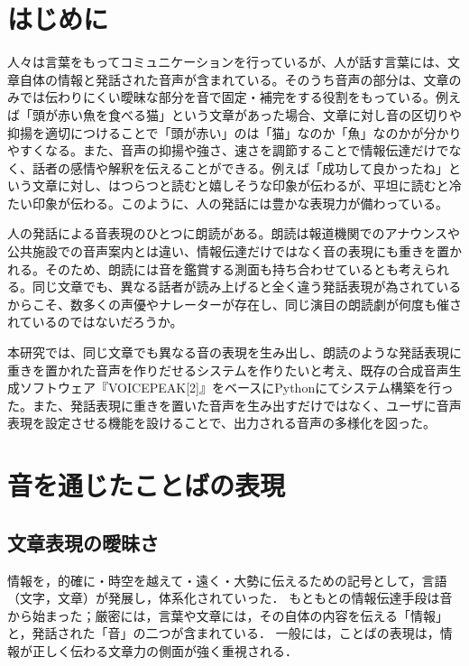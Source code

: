 



\section{はじめに}

人々は言葉をもってコミュニケーションを行っているが、人が話す言葉には、文章自体の情報と発話された音声が含まれている。そのうち音声の部分は、文章のみでは伝わりにくい曖昧な部分を音で固定・補完をする役割をもっている。例えば「頭が赤い魚を食べる猫」\cite{twitter}という文章があった場合、文章に対し音の区切りや抑揚を適切につけることで「頭が赤い」のは「猫」なのか「魚」なのかが分かりやすくなる。また、音声の抑揚や強さ、速さを調節することで情報伝達だけでなく、話者の感情や解釈を伝えることができる。例えば「成功して良かったね」という文章に対し、はつらつと読むと嬉しそうな印象が伝わるが、平坦に読むと冷たい印象が伝わる。このように、人の発話には豊かな表現力が備わっている。

人の発話による音表現のひとつに朗読がある。朗読は報道機関でのアナウンスや公共施設での音声案内とは違い、情報伝達だけではなく音の表現にも重きを置かれる。そのため、朗読には音を鑑賞する測面も持ち合わせているとも考えられる。同じ文章でも、異なる話者が読み上げると全く違う発話表現が為されているからこそ、数多くの声優やナレーターが存在し、同じ演目の朗読劇が何度も催されているのではないだろうか。

本研究では、同じ文章でも異なる音の表現を生み出し、朗読のような発話表現に重きを置かれた音声を作りだせるシステムを作りたいと考え、既存の合成音声生成ソフトウェア『VOICEPEAK[2]』をベースにPythonにてシステム構築を行った。また、発話表現に重きを置いた音声を生み出すだけではなく、ユーザに音声表現を設定させる機能を設けることで、出力される音声の多様化を図った。




\section{音を通じたことばの表現}
\subsection{文章表現の曖昧さ}
情報を，的確に・時空を越えて・遠く・大勢に伝えるための記号として，言語（文字，文章）が発展し，体系化されていった．
もともとの情報伝達手段は音から始まった；厳密には，言葉や文章には，その自体の内容を伝える「情報」と，発話された「音」の二つが含まれている．
一般には，ことばの表現は，情報が正しく伝わる文章力の側面が強く重視される．

